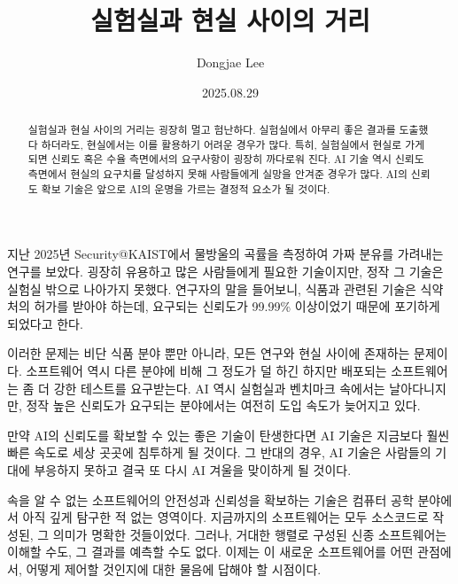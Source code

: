 \documentclass[11pt, oneside]{article}   	%
\title{실험실과 현실 사이의 거리}
\author{Dongjae Lee}
\date{2025.08.29}
\begin{document}
\maketitle


\begin{abstract}
	실험실과 현실 사이의 거리는 굉장히 멀고 험난하다.
	실험실에서 아무리 좋은 결과를 도출했다 하더라도, 현실에서는 이를 활용하기 어려운 경우가 많다.
	특히, 실험실에서 현실로 가게 되면 신뢰도 혹은 수율 측면에서의 요구사항이 굉장히 까다로워 진다.
	AI 기술 역시 신뢰도 측면에서 현실의 요구치를 달성하지 못해 사람들에게 실망을 안겨준 경우가 많다.
	AI의 신뢰도 확보 기술은 앞으로 AI의 운명을 가르는 결정적 요소가 될 것이다.
\end{abstract}
지난 2025년 Security@KAIST에서 물방울의 곡률을 측정하여 가짜 분유를 가려내는 연구를 보았다.
굉장히 유용하고 많은 사람들에게 필요한 기술이지만, 정작 그 기술은 실험실 밖으로 나아가지 못했다.
연구자의 말을 들어보니, 식품과 관련된 기술은 식약처의 허가를 받아야 하는데, 요구되는 신뢰도가 99.99\% 이상이었기 때문에 포기하게 되었다고 한다.

이러한 문제는 비단 식품 분야 뿐만 아니라, 모든 연구와 현실 사이에 존재하는 문제이다.
소프트웨어 역시 다른 분야에 비해 그 정도가 덜 하긴 하지만 배포되는 소프트웨어는 좀 더 강한 테스트를 요구받는다.
AI 역시 실험실과 벤치마크 속에서는 날아다니지만, 정작 높은 신뢰도가 요구되는 분야에서는 여전히 도입 속도가 늦어지고 있다.

만약 AI의 신뢰도를 확보할 수 있는 좋은 기술이 탄생한다면 AI 기술은 지금보다 훨씬 빠른 속도로 세상 곳곳에 침투하게 될 것이다.
그 반대의 경우, AI 기술은 사람들의 기대에 부응하지 못하고 결국 또 다시 AI 겨울을 맞이하게 될 것이다.

속을 알 수 없는 소프트웨어의 안전성과 신뢰성을 확보하는 기술은 컴퓨터 공학 분야에서 아직 깊게 탐구한 적 없는 영역이다.
지금까지의 소프트웨어는 모두 소스코드로 작성된, 그 의미가 명확한 것들이었다.
그러나, 거대한 행렬로 구성된 신종 소프트웨어는 이해할 수도, 그 결과를 예측할 수도 없다.
이제는 이 새로운 소프트웨어를 어떤 관점에서, 어떻게 제어할 것인지에 대한 물음에 답해야 할 시점이다.
\end{document}

